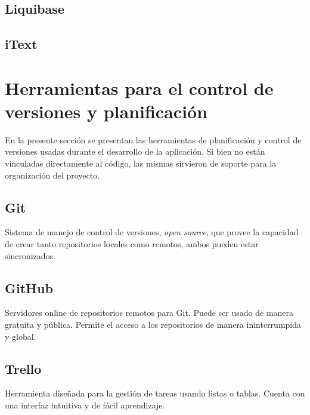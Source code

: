         \subsection{Liquibase}
        
        \subsection{iText}
        
    \section{Herramientas para el control de versiones y planificación}
    
    En la presente sección se presentan las herramientas de planificación y control de versiones usadas durante el desarrollo de la aplicación. Si bien no están vinculadas directamente al código, las mismas sirvieron de soporte para la organización del proyecto.
    
        \subsection{Git}
        
        Sistema de manejo de control de versiones, \textit{open source}, que provee la capacidad de crear tanto repositorios locales como remotos, ambos pueden estar sincronizados.
        
        \subsection{GitHub}
        
        Servidores online de repositorios remotos para Git. Puede ser usado de manera gratuita y pública. Permite el acceso a los repositorios de manera ininterrumpida y global.
        
        \subsection{Trello}
        
        Herramienta diseñada para la gestión de tareas usando listas o tablas. Cuenta con una interfaz intuitiva y de fácil aprendizaje.
        
        
        
    
\pagebreak